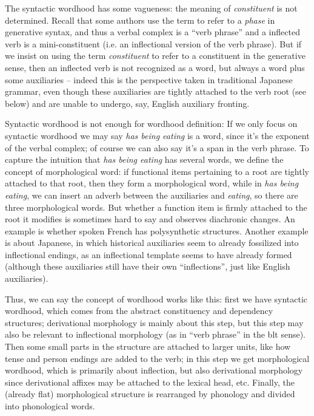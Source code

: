 \documentclass[UTF8, a4paper, oneside, scheme=plain, 12pt]{ctexbook}
\newcommand*{\term}[1]{\emph{#1}}
\newcommand{\form}[1]{\emph{#1}}
\begin{document}
{The syntactic wordhood has some vagueness:
the meaning of \term{constituent} is not determined.
Recall that some authors use the term to refer to a \emph{phase} in generative syntax,
and thus a verbal complex is a ``verb phrase'' 
and a inflected verb is a mini-constituent (i.e. an inflectional version of the verb phrase).
But if we insist on using the term \term{constituent} 
to refer to a constituent in the generative sense, 
then an inflected verb is not recognized as a word, 
but always a word plus some auxiliaries -- 
indeed this is the perspective taken in traditional Japanese grammar,
even though these auxiliaries are tightly attached to the verb root (see below)
and are unable to undergo, say, English auxiliary fronting.

Syntactic wordhood is not enough for wordhood definition:
If we only focus on syntactic wordhood 
we may say \form{has being eating} is a word,
since it's the exponent of the verbal complex;
of course we can also say it's a span in the verb phrase.
To capture the intuition that \form{has being eating} has several words, 
we define the concept of morphological word:
if functional items pertaining to a root 
are tightly attached to that root, 
then they form a morphological word,
while in \form{has being eating},
we can insert an adverb between the auxiliaries and \form{eating},
so there are three morphological words.
But whether a function item is firmly attached to the root it modifies is sometimes hard to say 
and observes diachronic changes. 
An example is whether spoken French has polysynthetic structures.
Another example is about Japanese, 
in which historical auxiliaries seem to already fossilized into inflectional endings,
as an inflectional template seems to have already formed
(although these auxiliaries still have their own ``inflections'',
just like English auxiliaries).

Thus, we can say the concept of wordhood works like this: 
first we have syntactic wordhood, 
which comes from the abstract constituency and dependency structures; 
derivational morphology is mainly about this step, 
but this step may also be relevant to inflectional morphology
(as in ``verb phrase'' in the \acs{blt} sense). 
Then some small parts in the structure 
are attached to larger units, like how tense and person endings are added to the verb; 
in this step we get morphological wordhood, 
which is primarily about inflection, 
but also derivational morphology 
since derivational affixes may be attached to the lexical head, etc.
Finally, the (already flat) morphological structure is rearranged 
by phonology and divided into phonological words.

}
\end{document}

